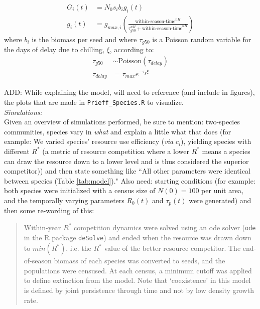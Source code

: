 \documentclass[11pt,letter]{article}
\begin{document}
\begin{align}
G_{i}(t) & = N_{0}s_{i}b_{i}g_{i}(t)\\
g_{i}(t) & = g_{max,i}(\frac{\text{within-season-time}^{nH}}{\tau_{g50}^{nH} + \text{within-season-time}^{nH}})
\end{align}
where $b_{i}$ is the biomass per seed and where $\tau_{g50}$ is a Poisson random variable for the days of delay due to chilling, $\xi$, according to:   \\
\begin{align}
\tau_{g50} & \sim \mathrm{Poisson}(\tau_{delay})\\
\tau_{delay} & = \tau_{max}e^{-\tau_{\xi}\xi}
\end{align}


ADD: While explaining the model, will need to reference (and include in figures), the plots that are made in \verb|Prieff_Species.R| to visualize. \\

\noindent \emph{Simulations:}\\
Given an overview of simulations performed, be sure to mention: two-species communities, species vary in \emph{what} and explain a little what that does (for example: We varied species' resource use efficiency (\emph{via} $c_i$), yielding species with different $R^*$ (a metric of resource competition where a lower $R^*$ means a species can draw the resource down to a lower level and is thus considered the superior competitor)) and then state something like ``All other parameters were identical between species (Table \ref{tab:model})." Also need: starting conditions (for example: both species were initialized with a census size of $N(0) = 100$ per unit area, and the temporally varying parameters $R_0(t)$ and $\tau_{p}(t)$ were generated) and then some re-wording of this:
\begin{quote}
Within-year $R^{*}$ competition dynamics were solved using an ode solver (\verb|ode| in the R package \verb|deSolve|) and ended when the resource was drawn down to $min(R^{*})$, i.e. the $R^{*}$ value of the better resource competitor.  The end-of-season biomass of each species was converted to seeds, and the populations were censused.  At each census, a minimum cutoff was applied to define extinction from the model.  Note that `coexistence' in this model is defined by joint persistence through time and not by low density growth rate. 
\end{quote}
\end{document}
